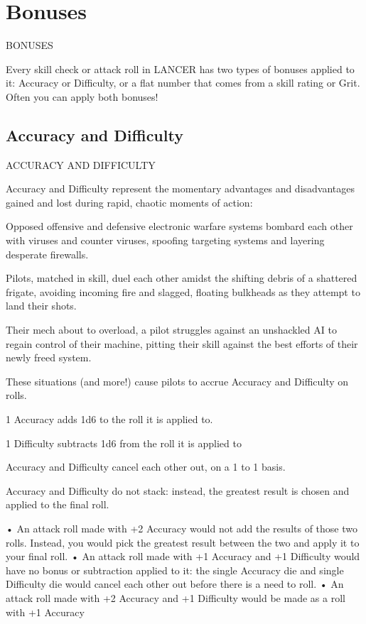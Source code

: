\chapter{Bonuses}
   BONUSES

Every skill check or attack roll in LANCER has two types of bonuses applied to it: Accuracy or
Difficulty, or a flat number that comes from a skill rating or Grit. Often you can apply both bonuses!

\section{Accuracy and Difficulty}
                                ACCURACY AND DIFFICULTY

Accuracy and Difficulty represent the momentary advantages and disadvantages gained and
lost during rapid, chaotic moments of action:


Opposed offensive and defensive electronic warfare systems bombard each other with viruses
and counter viruses, spoofing targeting systems and layering desperate firewalls.

Pilots, matched in skill, duel each other amidst the shifting debris of a shattered frigate, avoiding
incoming fire and slagged, floating bulkheads as they attempt to land their shots.

Their mech about to overload, a pilot struggles against an unshackled AI to regain control of their
machine, pitting their skill against the best efforts of their newly freed system.




These situations (and more!) cause pilots to accrue Accuracy and Difficulty on rolls.


1 Accuracy adds 1d6 to the roll it is applied to.

1 Difficulty subtracts 1d6 from the roll it is applied to

Accuracy and Difficulty cancel each other out, on a 1 to 1 basis.

Accuracy and Difficulty do not stack: instead, the greatest result is chosen and applied to the
final roll.

       •  An attack roll made with +2 Accuracy would not add the results of those two rolls.
          Instead, you would pick the greatest result between the two and apply it to your final roll.
       •  An attack roll made with +1 Accuracy and +1 Difficulty would have no bonus or
         subtraction applied to it: the single Accuracy die and single Difficulty die would cancel
          each other out before there is a need to roll.
       •  An attack roll made with +2 Accuracy and +1 Difficulty would be made as a roll with +1
         Accuracy

